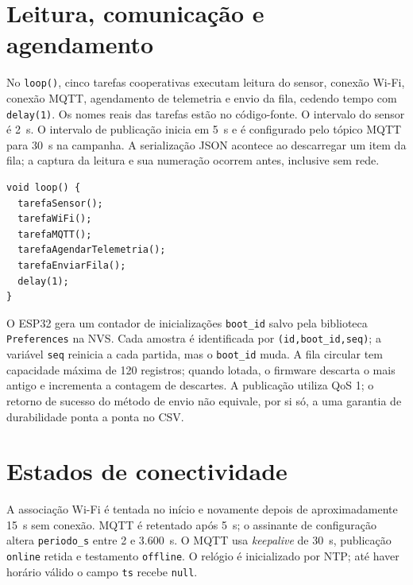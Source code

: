 \section{Leitura, comunicação e agendamento}\label{sec:firmware}
No \texttt{loop()}, cinco tarefas cooperativas executam leitura do sensor, conexão Wi-Fi, conexão MQTT, agendamento de telemetria e envio da fila, cedendo tempo com \texttt{delay(1)}. Os nomes reais das tarefas estão no código-fonte. O intervalo do sensor é 2~s. O intervalo de publicação inicia em 5~s e é configurado pelo tópico MQTT para 30~s na campanha. A serialização JSON acontece ao descarregar um item da fila; a captura da leitura e sua numeração ocorrem antes, inclusive sem rede.
\begin{lstlisting}[style=arduino,caption={Laço cooperativo do firmware de campanha},label={lst:laco}]
void loop() {
  tarefaSensor();
  tarefaWiFi();
  tarefaMQTT();
  tarefaAgendarTelemetria();
  tarefaEnviarFila();
  delay(1);
}
\end{lstlisting}
O ESP32 gera um contador de inicializações \texttt{boot\_id} salvo pela biblioteca \texttt{Preferences} na NVS. Cada amostra é identificada por \texttt{(id,boot\_id,seq)}; a variável \texttt{seq} reinicia a cada partida, mas o \texttt{boot\_id} muda. A fila circular tem capacidade máxima de 120 registros; quando lotada, o firmware descarta o mais antigo e incrementa a contagem de descartes. A publicação utiliza QoS 1; o retorno de sucesso do método de envio não equivale, por si só, a uma garantia de durabilidade ponta a ponta no CSV.
\section{Estados de conectividade}
A associação Wi-Fi é tentada no início e novamente depois de aproximadamente 15~s sem conexão. MQTT é retentado após 5~s; o assinante de configuração altera \texttt{periodo\_s} entre 2 e 3.600~s. O MQTT usa \emph{keepalive} de 30~s, publicação \texttt{online} retida e testamento \texttt{offline}. O relógio é inicializado por NTP; até haver horário válido o campo \texttt{ts} recebe \texttt{null}.
